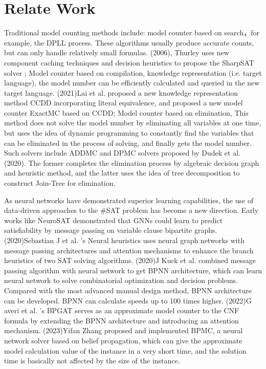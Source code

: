 \section{Relate Work}
Traditional model counting methods include: model counter based on search，for example, the DPLL process. 
These algorithms usually produce accurate counts, but can only handle relatively small formulas. (2006), 
Thurley uses new component caching techniques and decision heuristics to propose the SharpSAT solver
\cite{DBLP:conf/sat/Thurley06}; Model counter based on compilation, knowledge representation (i.e. target language), 
the model number can be efficiently calculated and queried in the new target language.  (2021)Lai et al.
proposed a new knowledge representation method CCDD\cite{DBLP:journals/corr/abs-2202-10025} incorporating 
literal equivalence, and proposed a new model counter ExactMC\cite{DBLP:conf/aaai/LaiMY21} based on CCDD;
Model counter based on elimination, This method does not solve the model number by eliminating all variables 
at one time, but uses the idea of dynamic programming to constantly find the variables that can be eliminated 
in the process of solving, and finally gets the model number. Such solvers include ADDMC\cite{DBLP:conf/aaai/DudekPV20} 
and DPMC\cite{DBLP:conf/sat/AchlioptasHT18a} solvers proposed by Dudek et al. (2020). The former completes the 
elimination process by algebraic decision graph and heuristic method, and the latter uses the idea of tree 
decomposition to construct Join-Tree for elimination.

As neural networks have demonstrated superior learning capabilities, the use of data-driven approaches to the 
\#SAT problem has become a new direction. Early works like NeuroSAT\cite{DBLP:conf/iclr/SelsamLBLMD19} 
demonstrated that GNNs could learn to predict satisfiability by message passing on  variable clause bipartite 
graphs. (2020)Sebastian J et al. 's Neural heuristics\cite{DBLP:journals/corr/abs-2012-14873} uses neural 
graph networks with message passing architectures and attention mechanisms to enhance the branch heuristics of 
two SAT solving algorithms. (2020)J Kuck et al. combined message passing algorithm with neural network to get 
BPNN architecture, which can learn neural network to solve combinatorial optimization and decision problems.
Compared with the most advanced manual design method, BPNN architecture can be developed. BPNN can calculate 
speeds up to 100 times higher. (2022)G averi et al. 's BPGAT\cite{DBLP:conf/esann/Saveri22} serves as an 
approximate model counter to the CNF formula by extending the BPNN architecture and introducing an attention 
mechanism. (2023)Yifan Zhang proposed and implemented BPMC\cite{1023549391.nh}, a neural network solver based 
on belief propagation, which can give the approximate model calculation value of the instance in a very short 
time, and the solution time is basically not affected by the size of the instance.
